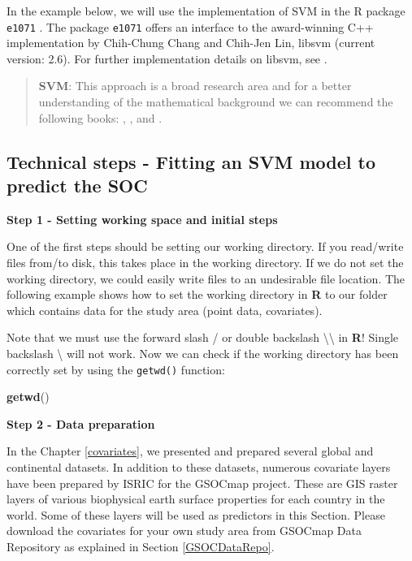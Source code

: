 \documentclass[10pt,b5paper,]{book}
\newenvironment{Shaded}{\begin{snugshade}}{\end{snugshade}}
\newcommand{\KeywordTok}[1]{\textcolor[rgb]{0.13,0.29,0.53}{\textbf{#1}}}
\newcommand{\NormalTok}[1]{#1}
\theoremstyle{definition}
\theoremstyle{definition}
\theoremstyle{definition}
\theoremstyle{remark}
\begin{document}
In the example below, we will use the implementation of SVM in the R
package \texttt{e1071} \citep{e1071}. The package \texttt{e1071} offers
an interface to the award-winning C++ implementation by Chih-Chung Chang
and Chih-Jen Lin, libsvm (current version: 2.6). For further
implementation details on libsvm, see \citet{chang2001libsvm}.

\begin{quote}
\textbf{SVM}: This approach is a broad research area and for a better
understanding of the mathematical background we can recommend the
following books: \citet{vapnik2013nature}, \citet{friedman2001elements},
and \citet{james2013introduction}.
\end{quote}

\hypertarget{technical-steps---fitting-an-svm-model-to-predict-the-soc}{%
\subsection{Technical steps - Fitting an SVM model to predict the
SOC}\label{technical-steps---fitting-an-svm-model-to-predict-the-soc}}

\textbf{Step 1 - Setting working space and initial steps}

One of the first steps should be setting our working directory. If you
read/write files from/to disk, this takes place in the working
directory. If we do not set the working directory, we could easily write
files to an undesirable file location. The following example shows how
to set the working directory in \textbf{R} to our folder which contains
data for the study area (point data, covariates).

Note that we must use the forward slash / or double backslash
\textbackslash{}\textbackslash{} in \textbf{R}! Single backslash
\textbackslash{} will not work. Now we can check if the working
directory has been correctly set by using the \texttt{getwd()} function:

\begin{Shaded}
\begin{Highlighting}[]
\KeywordTok{getwd}\NormalTok{()}
\end{Highlighting}
\end{Shaded}

\textbf{Step 2 - Data preparation}

In the Chapter \ref{covariates}, we presented and prepared several
global and continental datasets. In addition to these datasets, numerous
covariate layers have been prepared by ISRIC for the GSOCmap project.
These are GIS raster layers of various biophysical earth surface
properties for each country in the world. Some of these layers will be
used as predictors in this Section. Please download the covariates for
your own study area from GSOCmap Data Repository as explained in Section
\ref{GSOCDataRepo}.
\end{document}
